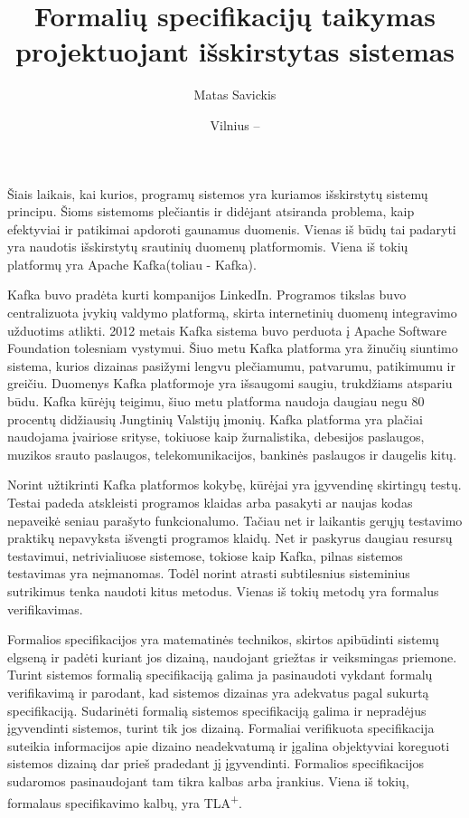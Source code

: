\documentclass{VUMIFPSmagistrinis}
\title{Formalių specifikacijų taikymas projektuojant išskirstytas sistemas}
\author{Matas Savickis}
\date{Vilnius – \the\year}
\begin{document}
\maketitle

\tableofcontents


		Šiais laikais, kai kurios, programų sistemos yra kuriamos išskirstytų sistemų principu\cite{mcr}.
		Šioms sistemoms plečiantis ir didėjant atsiranda problema, kaip efektyviai ir patikimai apdoroti gaunamus duomenis\cite{bucchiarone2018monolithic}.
		Vienas iš būdų tai padaryti yra naudotis išskirstytų srautinių duomenų platformomis.
		Viena iš tokių platformų yra Apache Kafka(toliau - Kafka)\cite{kfk}.


 		Kafka buvo pradėta kurti kompanijos LinkedIn\cite{kfk}. Programos tikslas buvo centralizuota įvykių valdymo platformą, skirta internetinių duomenų integravimo užduotims atlikti.
		2012 metais Kafka sistema buvo perduota į Apache Software Foundation tolesniam vystymui.
		Šiuo metu Kafka platforma yra žinučių siuntimo sistema, kurios dizainas pasižymi lengvu plečiamumu, patvarumu, patikimumu ir greičiu.
		Duomenys Kafka platformoje yra išsaugomi saugiu, trukdžiams atspariu būdu.
		Kafka kūrėjų teigimu, šiuo metu platforma naudoja daugiau negu 80 procentų didžiausių Jungtinių Valstijų įmonių\cite{kfk}.
		Kafka platforma yra plačiai naudojama įvairiose srityse, tokiuose kaip žurnalistika, debesijos paslaugos, muzikos srauto paslaugos, telekomunikacijos, bankinės paslaugos ir daugelis kitų\cite{kfk}.


		Norint užtikrinti Kafka platformos kokybę, kūrėjai yra įgyvendinę skirtingų testų\cite{kfkGH}.
		Testai padeda atskleisti programos klaidas arba pasakyti ar naujas kodas nepaveikė seniau parašyto funkcionalumo\cite{819971}.
		Tačiau net ir laikantis gerųjų testavimo praktikų nepavyksta išvengti programos klaidų.
		Net ir paskyrus daugiau resursų testavimui, netrivialiuose sistemose, tokiose kaip Kafka, pilnas sistemos testavimas yra neįmanomas\cite{sullivan2004software}.
		Todėl norint atrasti subtilesnius sisteminius sutrikimus tenka naudoti kitus metodus.
		Vienas iš tokių metodų yra formalus verifikavimas.


		Formalios specifikacijos yra matematinės technikos, skirtos apibūdinti sistemų elgseną ir padėti kuriant jos dizainą, naudojant griežtas ir veiksmingas priemone\cite{holzmann1995improvement}.
		Turint sistemos formalią specifikaciją galima ja pasinaudoti vykdant formalų verifikavimą ir parodant, kad sistemos dizainas yra adekvatus pagal sukurtą specifikaciją.
		Sudarinėti formalią sistemos specifikaciją galima ir nepradėjus įgyvendinti sistemos, turint tik jos dizainą. 
		Formaliai verifikuota specifikacija suteikia informacijos apie dizaino neadekvatumą ir įgalina objektyviai koreguoti sistemos dizainą dar prieš pradedant jį įgyvendinti.
		Formalios specifikacijos sudaromos pasinaudojant tam tikra kalbas arba įrankius.
		Viena iš tokių, formalaus specifikavimo kalbų, yra TLA\textsuperscript{+}.
		
\end{document}
